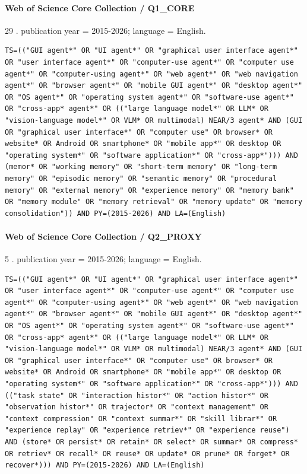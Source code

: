 \noindent\begin{minipage}{\linewidth}
\paragraph{Web of Science Core Collection / Q1\_CORE}
29 .
publication year = 2015-2026; language = English.
\begin{lstlisting}
TS=(("GUI agent*" OR "UI agent*" OR "graphical user interface agent*" OR "user interface agent*" OR "computer-use agent*" OR "computer use agent*" OR "computer-using agent*" OR "web agent*" OR "web navigation agent*" OR "browser agent*" OR "mobile GUI agent*" OR "desktop agent*" OR "OS agent*" OR "operating system agent*" OR "software-use agent*" OR "cross-app* agent*" OR (("large language model*" OR LLM* OR "vision-language model*" OR VLM* OR multimodal) NEAR/3 agent* AND (GUI OR "graphical user interface*" OR "computer use" OR browser* OR website* OR Android OR smartphone* OR "mobile app*" OR desktop OR "operating system*" OR "software application*" OR "cross-app*"))) AND (memor* OR "working memory" OR "short-term memory" OR "long-term memory" OR "episodic memory" OR "semantic memory" OR "procedural memory" OR "external memory" OR "experience memory" OR "memory bank" OR "memory module" OR "memory retrieval" OR "memory update" OR "memory consolidation")) AND PY=(2015-2026) AND LA=(English)
\end{lstlisting}
\end{minipage}\par\medskip
\noindent\begin{minipage}{\linewidth}
\paragraph{Web of Science Core Collection / Q2\_PROXY}
5 .
publication year = 2015-2026; language = English.
\begin{lstlisting}
TS=(("GUI agent*" OR "UI agent*" OR "graphical user interface agent*" OR "user interface agent*" OR "computer-use agent*" OR "computer use agent*" OR "computer-using agent*" OR "web agent*" OR "web navigation agent*" OR "browser agent*" OR "mobile GUI agent*" OR "desktop agent*" OR "OS agent*" OR "operating system agent*" OR "software-use agent*" OR "cross-app* agent*" OR (("large language model*" OR LLM* OR "vision-language model*" OR VLM* OR multimodal) NEAR/3 agent* AND (GUI OR "graphical user interface*" OR "computer use" OR browser* OR website* OR Android OR smartphone* OR "mobile app*" OR desktop OR "operating system*" OR "software application*" OR "cross-app*"))) AND (("task state" OR "interaction histor*" OR "action histor*" OR "observation histor*" OR trajector* OR "context management" OR "context compression" OR "context summar*" OR "skill librar*" OR "experience replay" OR "experience retriev*" OR "experience reuse") AND (store* OR persist* OR retain* OR select* OR summar* OR compress* OR retriev* OR recall* OR reuse* OR update* OR prune* OR forget* OR recover*))) AND PY=(2015-2026) AND LA=(English)
\end{lstlisting}
\end{minipage}\par\medskip
